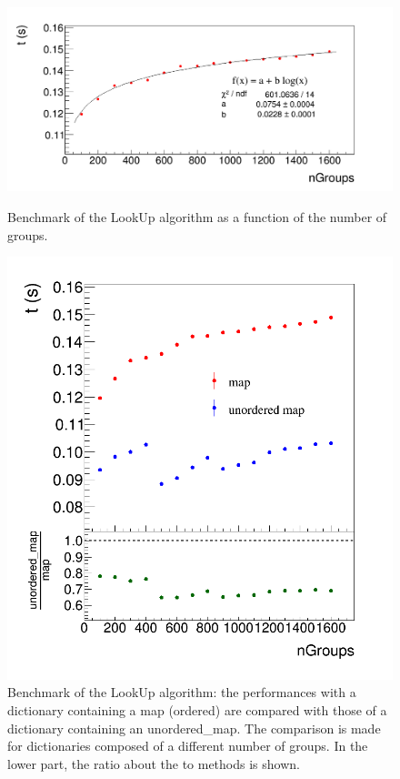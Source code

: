 \begin{figure}
  \centering
  \includegraphics[scale=0.3]{figures/ordered.png}
  \caption{Benchmark of the LookUp algorithm as a function of the number of groups.}
  \label{fig:ordered}
  \includegraphics[scale=0.4]{figures/bench.png}
  \caption{Benchmark of the LookUp algorithm: the performances with a dictionary containing a map (ordered) are compared with those of a dictionary containing an unordered\_map. The comparison is made for dictionaries composed of a different number of groups. In the lower part, the ratio about the to methods is shown.}
  \label{fig:bench}
\end{figure}
